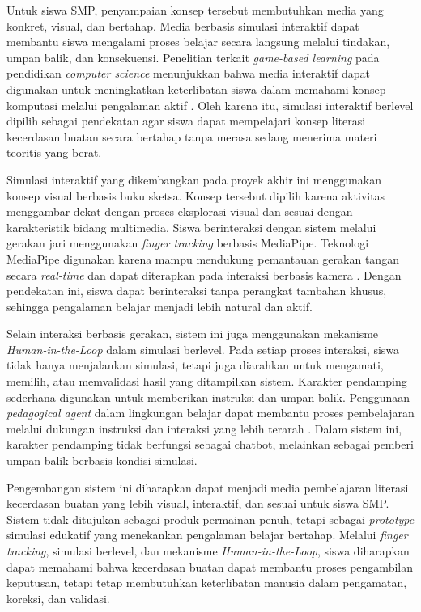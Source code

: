 \documentclass[12pt,a4paper,oneside,openany]{report}
\begin{document}
Untuk siswa SMP, penyampaian konsep tersebut membutuhkan media yang konkret, visual, dan bertahap. Media berbasis simulasi interaktif dapat membantu siswa mengalami proses belajar secara langsung melalui tindakan, umpan balik, dan konsekuensi. Penelitian terkait \textit{game-based learning} pada pendidikan \textit{computer science} menunjukkan bahwa media interaktif dapat digunakan untuk meningkatkan keterlibatan siswa dalam memahami konsep komputasi melalui pengalaman aktif \cite{ref6}. Oleh karena itu, simulasi interaktif berlevel dipilih sebagai pendekatan agar siswa dapat mempelajari konsep literasi kecerdasan buatan secara bertahap tanpa merasa sedang menerima materi teoritis yang berat.

Simulasi interaktif yang dikembangkan pada proyek akhir ini menggunakan konsep visual berbasis buku sketsa. Konsep tersebut dipilih karena aktivitas menggambar dekat dengan proses eksplorasi visual dan sesuai dengan karakteristik bidang multimedia. Siswa berinteraksi dengan sistem melalui gerakan jari menggunakan \textit{finger tracking} berbasis MediaPipe. Teknologi MediaPipe digunakan karena mampu mendukung pemantauan gerakan tangan secara \textit{real-time} dan dapat diterapkan pada interaksi berbasis kamera \cite{ref10}. Dengan pendekatan ini, siswa dapat berinteraksi tanpa perangkat tambahan khusus, sehingga pengalaman belajar menjadi lebih natural dan aktif.

Selain interaksi berbasis gerakan, sistem ini juga menggunakan mekanisme \textit{Human-in-the-Loop} dalam simulasi berlevel. Pada setiap proses interaksi, siswa tidak hanya menjalankan simulasi, tetapi juga diarahkan untuk mengamati, memilih, atau memvalidasi hasil yang ditampilkan sistem. Karakter pendamping sederhana digunakan untuk memberikan instruksi dan umpan balik. Penggunaan \textit{pedagogical agent} dalam lingkungan belajar dapat membantu proses pembelajaran melalui dukungan instruksi dan interaksi yang lebih terarah \cite{ref9}. Dalam sistem ini, karakter pendamping tidak berfungsi sebagai chatbot, melainkan sebagai pemberi umpan balik berbasis kondisi simulasi.

Pengembangan sistem ini diharapkan dapat menjadi media pembelajaran literasi kecerdasan buatan yang lebih visual, interaktif, dan sesuai untuk siswa SMP. Sistem tidak ditujukan sebagai produk permainan penuh, tetapi sebagai \textit{prototype} simulasi edukatif yang menekankan pengalaman belajar bertahap. Melalui \textit{finger tracking}, simulasi berlevel, dan mekanisme \textit{Human-in-the-Loop}, siswa diharapkan dapat memahami bahwa kecerdasan buatan dapat membantu proses pengambilan keputusan, tetapi tetap membutuhkan keterlibatan manusia dalam pengamatan, koreksi, dan validasi.
\end{document}
